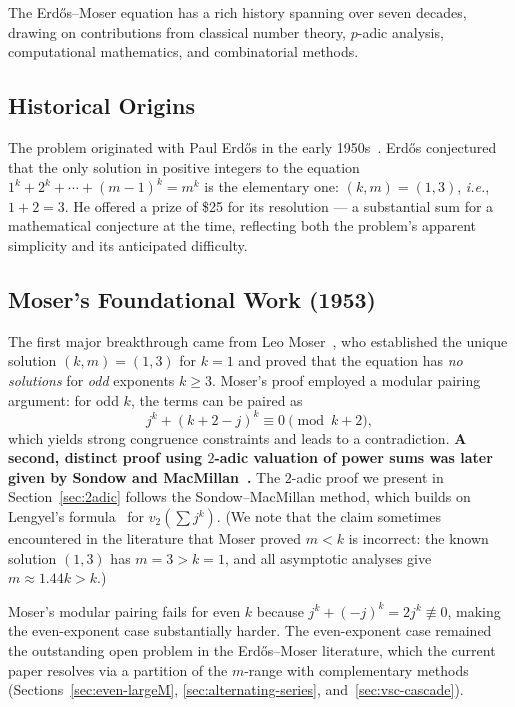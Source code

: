 \documentclass[12pt,a4paper]{article}
\theoremstyle{plain}
\theoremstyle{definition}
\newcommand{\ie}{\textit{i.e.},\ }
\begin{document}
The Erd\H{o}s--Moser equation has a rich history spanning over seven
decades, drawing on contributions from classical number theory, $p$-adic
analysis, computational mathematics, and combinatorial methods.

\subsection{Historical Origins}

The problem originated with Paul Erd\H{o}s in the early 1950s~\cite{ErdosMoser}.
Erd\H{o}s conjectured that the only solution in positive integers to the
equation $1^k + 2^k + \cdots + (m-1)^k = m^k$ is the elementary one:
$(k,m) = (1,3)$, \ie $1+2 = 3$.  He offered a prize of \$25 for its
resolution --- a substantial sum for a mathematical conjecture at the time,
reflecting both the problem's apparent simplicity and its anticipated difficulty.

\subsection{Moser's Foundational Work (1953)}

The first major breakthrough came from Leo Moser~\cite{Moser}, who established
the unique solution $(k,m) = (1,3)$ for $k=1$ and proved that the equation has
\emph{no solutions} for \emph{odd} exponents $k \ge 3$.
Moser's proof employed a modular pairing argument: for odd $k$, the
terms can be paired as
\[
  j^k + (k+2-j)^k \equiv 0 \pmod{k+2},
\]
which yields strong congruence constraints and leads to a contradiction.
\textbf{A second, distinct proof using $2$-adic valuation of power sums
was later given by Sondow and MacMillan~\cite{SondowMacMillan}.}
The $2$-adic proof we present in Section~\ref{sec:2adic} follows the
Sondow--MacMillan method, which builds on Lengyel's formula~\cite{Lengyel}
for $v_2(\sum j^k)$.
(We note that the claim sometimes encountered in the literature that
Moser proved $m < k$ is incorrect: the known solution
$(1,3)$ has $m=3 > k=1$, and all asymptotic analyses give
$m \approx 1.44k > k$.)

Moser's modular pairing fails for even $k$ because
$j^k + (-j)^k = 2j^k \not\equiv 0$, making the even-exponent case
substantially harder.  The even-exponent case remained the outstanding
open problem in the Erd\H{o}s--Moser literature, which the current
paper resolves via a partition of the $m$-range with complementary methods
(Sections~\ref{sec:even-largeM}, \ref{sec:alternating-series},
and~\ref{sec:vsc-cascade}).
\end{document}
